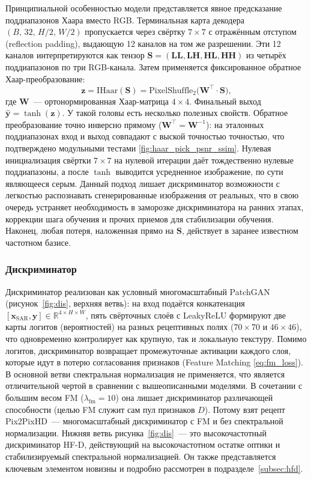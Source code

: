 Принципиальной особенностью модели представляется явное предсказание
поддиапазонов Хаара вместо RGB. Терминальная карта декодера
$(B,\,32,\,H/2,\,W/2)$ пропускается через свёртку $7{\times}7$ с отражённым
отступом (reflection padding), выдающую 12 каналов на том же разрешении.
Эти 12 каналов интерпретируются
как тензор $\mathbf{S}=(\mathbf{LL},\mathbf{LH},\mathbf{HL},\mathbf{HH})$ из четырёх
поддиапазонов по три RGB-канала. Затем применяется фиксированное обратное
Хаар-преобразование:
\begin{equation}
  \mathbf{z}=\mathrm{IHaar}(\mathbf{S})
            =\mathrm{PixelShuffle}_{2}\bigl(\mathbf{W}^{\top}\!\cdot\mathbf{S}\bigr),
  \label{eq:ihaar}
\end{equation}
где $\mathbf{W}$~--- ортонормированная Хаар-матрица $4{\times}4$. Финальный выход
$\hat{\mathbf{y}}=\tanh(\mathbf{z})$. У такой головы есть несколько полезных
свойств. Обратное преобразование точно инверсно прямому ($\mathbf{W}^{\top}
=\mathbf{W}^{-1}$): на эталонных поддиапазонах вход и выход совпадают с выской точностью точностью, что подтверждено модульными тестами \ref{fig:haar_pick_psnr_ssim}.
Нулевая инициализация
свёртки $7{\times}7$ на нулевой итерации даёт тождественно нулевые поддиапазоны, а
после $\tanh$ выводится усредненное изображение, по сути являющееся серым.
Данный подход лишает дискриминатор возможности с легкостью распознавать сгенерированные изображения от реальных, что в свою очередь устраняет необходимость
в заморозке дискриминатора на ранних этапах, коррекции шага обучения и прочих приемов для стабилизации обучения.
Наконец, любая потеря, наложенная прямо на $\mathbf{S}$, действует в заранее известном частотном базисе.

\subsubsection{Дискриминатор}

Дискриминатор реализован как условный многомасштабный PatchGAN
(рисунок~\ref{fig:dis}, верхняя ветвь): на вход подаётся конкатенация
$[\mathbf{x}_{\text{SAR}},\mathbf{y}]\in\mathbb{R}^{4\times H\times W}$, пять
свёрточных слоёв с LeakyReLU формируют две карты логитов (вероятностей) на разных рецептивных
полях ($70{\times}70$ и $46{\times}46$), что одновременно контролирует как крупную, так и локальную текстуру.
Помимо логитов, дискриминатор возвращает
промежуточные активации каждого слоя, которые идут в потерю согласования
признаков (Feature Matching \ref{eq:fm_loss}). В основной ветви спектральная нормализация
не применяется, что является отличительной чертой в сравнении с вышеописанными моделями.
В сочетании с большим весом FM ($\lambda_{\text{fm}}=10$)
она лишает дискриминатор различающей способности (целью FM служит сам пул
признаков $D$). Потому взят рецепт Pix2PixHD~--- многомасштабный
дискриминатор с FM и без спектральной нормализации. Нижняя ветвь
рисунка~\ref{fig:dis}~--- это высокочастотный дискриминатор HF-D, действующий на
высокочастотном остатке оптики и стабилизируемый спектральной нормализацией.
Он также представляется ключевым элементом новизны и подробно рассмотрен в
подразделе~\ref{subsec:hfd}.

